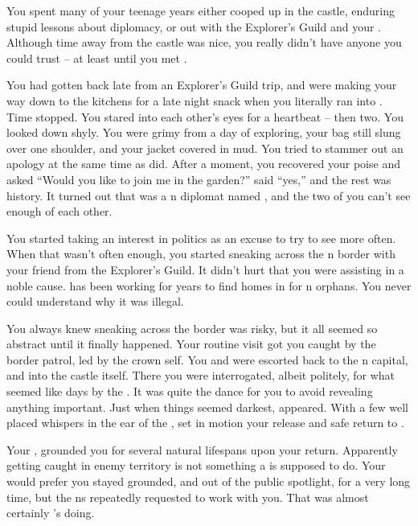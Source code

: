 \documentclass[char]{NeptuneBall}
\begin{document}
You spent many of your teenage years either cooped up in the castle, enduring stupid lessons about diplomacy, or out with the Explorer's Guild and your \cPlant{\uncle}. Although time away from the castle was nice, you really didn't have anyone you could trust -- at least until you met \emph{\cDiplomat{\them}}.

You had gotten back late from an Explorer's Guild trip, and were making your way down to the kitchens for a late night snack when you literally ran into \emph{\cDiplomat{\them}}. Time stopped. You stared into each other's eyes for a heartbeat -- then two. You looked down shyly. You were grimy from a day of exploring, your bag still slung over one shoulder, and your jacket covered in mud. You tried to stammer out an apology at the same time as \cDiplomat{\they} did. After a moment, you recovered your poise and asked ``Would you like to join me in the garden?'' \cDiplomat{\They} said ``yes,'' and the rest was history.  It turned out that \cDiplomat{\they} was a \pPacifica{}n diplomat named \cDiplomat{}, and the two of you can't see enough of each other. 

You started taking an interest in politics as an excuse to try to see \cDiplomat{\them} more often. When that wasn't often enough, you started sneaking across the \pPacifica{}n border with your friend \cPriest{} from the Explorer's Guild. It didn't hurt that you were assisting in a noble cause. \cPriest{} has been working for years to find homes in \pPacifica{} for \pAtlantis{}n orphans. You never could understand why it was illegal.

You always knew sneaking across the border was risky, but it all seemed so abstract until it finally happened. Your routine visit got you caught by the border patrol, led by the crown \cPrince{\Prince} \cPrince{\them}self. You and \cPriest{} were escorted back to the \pPacifica{}n capital, and into the castle itself. There you were interrogated, albeit politely, for what seemed like days by the \cPrince{\prince}. It was quite the dance for you to avoid revealing anything important. Just when things seemed darkest, \cDiplomat{} appeared. With a few well placed whispers in the ear of the \cPrince{\Prince}, \cDiplomat{\they} set in motion your release and safe return to \pAtlantis{}.

Your \cKing{\parent}, \cKing{\King} \cKing{} grounded you for several natural lifespans upon your return. Apparently getting caught in enemy territory is not something a \cPrincess{\prince} is supposed to do. Your \cKing{\parent} would prefer you stayed grounded, and out of the public spotlight, for a very long time, but the \pPacifica{}ns repeatedly requested to work with you. That was almost certainly \cDiplomat{}'s doing. 
\end{document}
